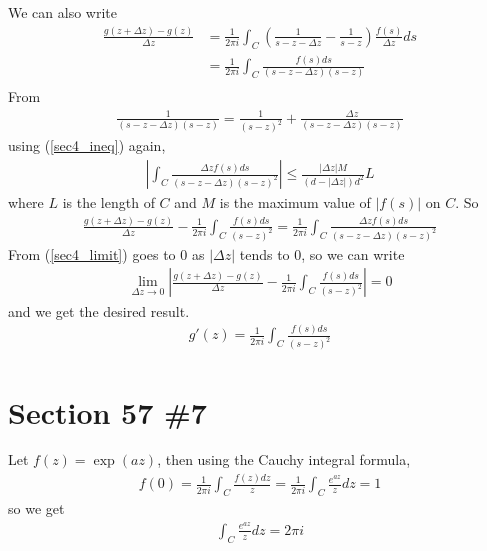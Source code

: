 \documentclass{scrartcl}
\begin{document}
We can also write
\begin{align*}
  \frac{g(z + \Delta z) - g(z)}{\Delta z} &= \frac{1}{2\pi i} \int_C \left( \frac{1}{s - z - \Delta z} - \frac{1}{s - z} \right) \frac{f(s)}{\Delta z} ds \\
                                          &= \frac{1}{2\pi i} \int_C \frac{f(s) ds}{(s - z - \Delta z)(s - z)} \\
\end{align*}
From
\begin{align*}
  \frac{1}{(s - z - \Delta z)(s - z)} = \frac{1}{(s - z)^2} + \frac{\Delta z}{(s - z - \Delta z)(s - z)}
\end{align*}
using (\ref{sec4_ineq}) again,
\begin{align}\label{sec4_limit}
  \left| \int_C \frac{\Delta z f(s) ds}{(s - z - \Delta z)(s - z)^2} \right| \leq \frac{|\Delta z| M}{(d - |\Delta z|) d^2} L
\end{align}
where \(L\) is the length of \(C\) and \(M\) is the maximum value of \(|f(s)|\) on \(C\).
So
\begin{align*}
  \frac{g(z + \Delta z) - g(z)}{\Delta z} - \frac{1}{2\pi i} \int_C \frac{f(s) ds}{(s - z)^2} = \frac{1}{2\pi i} \int_C \frac{\Delta z f(s) ds}{(s - z - \Delta z)(s - z)^2}
\end{align*}
From (\ref{sec4_limit}) goes to 0 as \(|\Delta z|\) tends to 0, so we can write
\begin{align*}
  \lim_{\Delta z \to 0} \left| \frac{g(z + \Delta z) - g(z)}{\Delta z} - \frac{1}{2\pi i} \int_C \frac{f(s) ds}{(s - z)^2} \right| = 0
\end{align*}
and we get the desired result.
\begin{align*}
  g'(z) = \frac{1}{2\pi i} \int_C \frac{f(s) ds}{(s - z)^2}
\end{align*}

\section{Section 57 \#7}
Let \(f(z) = \exp(az)\), then using the Cauchy integral formula,
\begin{align*}
  f(0) = \frac{1}{2\pi i} \int_C \frac{f(z) dz}{z} = \frac{1}{2\pi i} \int_C \frac{e^{az}}{z} dz = 1
\end{align*}
so we get
\begin{align*}
  \int_C \frac{e^{az}}{z} dz = 2\pi i
\end{align*}
\end{document}

